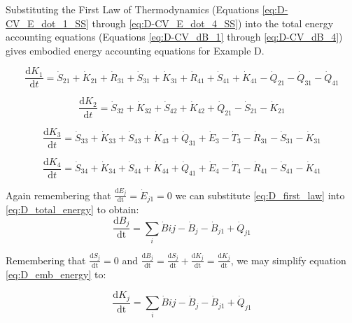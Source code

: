 Substituting the First Law of Thermodynamics (Equations \ref{eq:D-CV_E_dot_1_SS} through \ref{eq:D-CV_E_dot_4_SS}) into the total energy accounting equations (Equations \ref{eq:D-CV_dB_1} through \ref{eq:D-CV_dB_4}) gives embodied energy accounting equations for Example D.

\begin{equation} \label{eq:D-embodied_acct_1}
	\frac{\mathrm{d}K_{1}}{\mathrm{d}t} 	 = \dot{S}_{21} + \dot{K}_{21} + \dot{R}_{31} + \dot{S}_{31} + \dot{K}_{31} + \dot{R}_{41} +\dot{S}_{41} + \dot{K}_{41} - \dot{Q}_{21} - \dot{Q}_{31} - \dot{Q}_{41}
\end{equation}

\begin{equation} \label{eq:D-embodied_acct_2}
	\frac{\mathrm{d}K_{2}}{\mathrm{d}t} 	 = \dot{S}_{32} + \dot{K}_{32} + \dot{S}_{42} + \dot{K}_{42} + \dot{Q}_{21} - \dot{S}_{21} - \dot{K}_{21}
\end{equation}

\begin{equation} \label{eq:D-embodied_acct_3}
	\frac{\mathrm{d}K_{3}}{\mathrm{d}t} 	 = \dot{S}_{33} + \dot{K}_{33} + \dot{S}_{43} + \dot{K}_{43} + \dot{Q}_{31} + \dot{E}_{3} - \dot{T}_{3} - \dot{R}_{31} - \dot{S}_{31} - \dot{K}_{31}
\end{equation}

\begin{equation} \label{eq:D-embodied_acct_4}
	\frac{\mathrm{d}K_{4}}{\mathrm{d}t} 	 = \dot{S}_{34} + \dot{K}_{34} + \dot{S}_{44} + \dot{K}_{44} + \dot{Q}_{41} + \dot{E}_{4} - \dot{T}_{4} - \dot{R}_{41} - \dot{S}_{41} - \dot{K}_{41}
\end{equation}


Again remembering that $\frac{\textrm{d}E_{j}}{\textrm{dt}} = \dot{E}_{j1} = 0$ we can substitute \ref{eq:D_first_law} into \ref{eq:D_total_energy} to obtain:
%
\begin{equation}\label{eq:D_emb_energy}
\frac{\textrm{d}B_{j}}{\textrm{dt}} = \sum_{i}\dot{B}{ij} - \dot{B}_{j} - \dot{B}_{j1} + \dot{Q}_{j1}
\end{equation}

Remembering that $\frac{\textrm{d}S_{j}}{\textrm{dt}} = 0$ and $\frac{\textrm{d}B_{j}}{\textrm{dt}} = \frac{\textrm{d}S_{j}}{\textrm{dt}} + \frac{\textrm{d}K_{j}}{\textrm{dt}} = \frac{\textrm{d}K_{j}}{\textrm{dt}}$, we may simplify equation \ref{eq:D_emb_energy} to:

\begin{equation}\label{eq:D_emb_energy_dK}
\frac{\textrm{d}K_{j}}{\textrm{dt}} = \sum_{i}\dot{B}{ij} - \dot{B}_{j} - \dot{B}_{j1} + \dot{Q}_{j1}
\end{equation}

